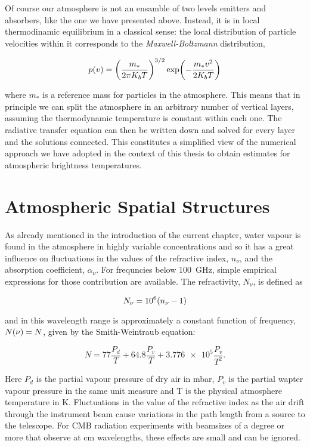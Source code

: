 Of course our atmosphere is not an ensamble of two levels emitters and
absorbers, like the one we have presented above. Instead, it is in local
thermodinamic equilibrium in a classical sense: the local distribution of
particle velocities within it corresponds to the \emph{Maxwell-Boltzmann}
distribution,

\begin{equation}
        p\qty(v) = \qty(\frac{m_*}{2\pi K_b T})^{3/2}
        \exp(-\frac{m_* v^2}{2 K_b T})
\end{equation}

where $m_*$ is a reference mass for particles in the atmosphere.
This means that in principle we can split the atmosphere in an arbitrary
number of vertical layers, assuming the thermodynamic temperature is
constant within each one.  The radiative transfer equation can then be
written down and solved for every layer and the solutions connected. This
constitutes a simplified view of the numerical approach we have adopted in
the context of this thesis to obtain estimates for atmospheric brightness
temperatures.

\section{Atmospheric Spatial Structures}

As already mentioned in the introduction of the current chapter, water
vapour is found in the atmosphere in highly variable concentrations and so
it has a great influence on fluctuations in the values of the refractive
index, $n_\nu$, and the absorption coefficient, $\alpha_\nu$. For frequncies
below \SI{100}{\giga\hertz}, simple empirical expressions for those
contribution are available. The refractivity, $N_\nu$, is defined as

\begin{equation}
        N_\nu = \num{e6}\qty(n_\nu - 1)
\end{equation}

and in this wavelength range is approximately a constant function of
frequency, $N\qty(\nu) = N$, given by the Smith-Weintraub equation:

\begin{equation}
        N = 77\frac{P_d}{T} + 64.8\frac{P_v}{T} +
        \num{3.776e5}\frac{P_v}{T^2}.
\end{equation}

Here $P_d$ is the partial vapour pressure of dry air in
\si{\milli\bar}, $P_v$ is the partial wapter vapour pressure in the same
unit measure and T is the physical atmosphere temperature in \si{\kelvin}.
Fluctuations in the value of the refractive index as the air drift through
the instrument beam cause variations in the path length from a source to
the telescope. For CMB radiation experiments with beamsizes of a degree or
more that observe at \si{\centi\meter} wavelengths, these effects are small
and can be ignored.


